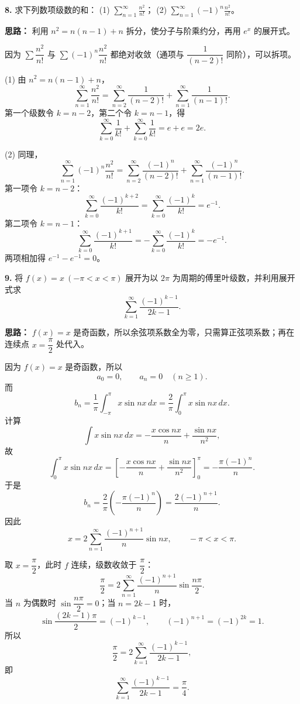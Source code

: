 \else \answerarea[8] \fi%

\textbf{8.} 求下列数项级数的和：
(1) $\displaystyle\sum_{n=1}^{\infty}\frac{n^2}{n!}$；
(2) $\displaystyle\sum_{n=1}^{\infty}(-1)^n\frac{n^2}{n!}$。

\ifshowsolutions%
\textbf{思路：} 利用 $n^2=n(n-1)+n$ 拆分，使分子与阶乘约分，再用 $e^x$ 的展开式。

因为 $\sum\dfrac{n^2}{n!}$ 与 $\sum(-1)^n\dfrac{n^2}{n!}$ 都绝对收敛（通项与 $\dfrac{1}{(n-2)!}$ 同阶），可以拆项。

(1) 由 $n^2=n(n-1)+n$，
\[
\sum_{n=1}^{\infty}\frac{n^2}{n!}
=\sum_{n=2}^{\infty}\frac{1}{(n-2)!}
+\sum_{n=1}^{\infty}\frac{1}{(n-1)!}.
\]
第一个级数令 $k=n-2$，第二个令 $k=n-1$，得
\[
\sum_{k=0}^{\infty}\frac{1}{k!}+\sum_{k=0}^{\infty}\frac{1}{k!}
=e+e=2e.
\]

(2) 同理，
\[
\sum_{n=1}^{\infty}(-1)^n\frac{n^2}{n!}
=\sum_{n=2}^{\infty}\frac{(-1)^n}{(n-2)!}
+\sum_{n=1}^{\infty}\frac{(-1)^n}{(n-1)!}.
\]
第一项令 $k=n-2$：
\[
\sum_{k=0}^{\infty}\frac{(-1)^{k+2}}{k!}
=\sum_{k=0}^{\infty}\frac{(-1)^k}{k!}=e^{-1}.
\]
第二项令 $k=n-1$：
\[
\sum_{k=0}^{\infty}\frac{(-1)^{k+1}}{k!}
=-\sum_{k=0}^{\infty}\frac{(-1)^k}{k!}=-e^{-1}.
\]
两项相加得 $e^{-1}-e^{-1}=0$。

\else \answerarea[8] \fi%

\textbf{9.} 将 $f(x)=x\ (-\pi<x<\pi)$ 展开为以 $2\pi$ 为周期的傅里叶级数，并利用展开式求
\[
\sum_{k=1}^{\infty}\frac{(-1)^{k-1}}{2k-1}.
\]

\ifshowsolutions%
\textbf{思路：} $f(x)=x$ 是奇函数，所以余弦项系数全为零，只需算正弦项系数；再在连续点 $x=\dfrac{\pi}{2}$ 处代入。

因为 $f(x)=x$ 是奇函数，所以
\[
a_0=0,\qquad a_n=0\quad(n\ge1).
\]
而
\[
b_n=\frac1\pi\int_{-\pi}^{\pi}x\sin nx\,dx
=\frac2\pi\int_0^{\pi}x\sin nx\,dx.
\]
计算
\[
\int x\sin nx\,dx=-\frac{x\cos nx}{n}+\frac{\sin nx}{n^2},
\]
故
\[
\int_0^{\pi}x\sin nx\,dx
=\left[-\frac{x\cos nx}{n}+\frac{\sin nx}{n^2}\right]_0^{\pi}
=-\frac{\pi(-1)^n}{n}.
\]
于是
\[
b_n=\frac2\pi\left(-\frac{\pi(-1)^n}{n}\right)
=\frac{2(-1)^{n+1}}{n}.
\]
因此
\[
x=2\sum_{n=1}^{\infty}\frac{(-1)^{n+1}}{n}\sin nx,
\qquad -\pi<x<\pi.
\]

取 $x=\dfrac{\pi}{2}$，此时 $f$ 连续，级数收敛于 $\dfrac{\pi}{2}$：
\[
\frac{\pi}{2}
=2\sum_{n=1}^{\infty}\frac{(-1)^{n+1}}{n}\sin\frac{n\pi}{2}.
\]
当 $n$ 为偶数时 $\sin\dfrac{n\pi}{2}=0$；当 $n=2k-1$ 时，
\[
\sin\frac{(2k-1)\pi}{2}=(-1)^{k-1},\qquad
(-1)^{n+1}=(-1)^{2k}=1.
\]
所以
\[
\frac{\pi}{2}
=2\sum_{k=1}^{\infty}\frac{(-1)^{k-1}}{2k-1},
\]
即
\[
\sum_{k=1}^{\infty}\frac{(-1)^{k-1}}{2k-1}=\frac{\pi}{4}.
\]

